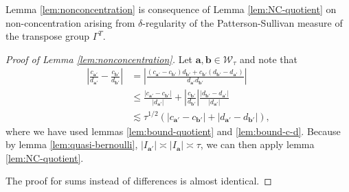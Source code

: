 \documentclass[12pt]{amsart}
\newcommand*\abs[1]{
	\left|#1\right|
}
\theoremstyle{definition}
\renewcommand{\leq}{\leqslant}
\begin{document}
Lemma \ref{lem:nonconcentration} is consequence of Lemma \ref{lem:NC-quotient} on non-concentration arising from $\delta$-regularity of the Patterson-Sullivan measure of the transpose group $\Gamma^T$.

\begin{proof}[Proof of Lemma \ref{lem:nonconcentration}]
Let $\mathbf{a}, \mathbf{b} \in \mathcal{W}_\tau$ and note that
\begin{align*}
\abs{\frac{c_{\mathbf{a}'}}{d_{\mathbf{a}'}} - \frac{c_{\mathbf{b}'}}{d_{\mathbf{b}'}}}
&= \abs{\frac{\left(c_{\mathbf{a}'} - c_{\mathbf{b}'}\right)d_{\mathbf{b}'} +c_{\mathbf{b}'}\left(d_{\mathbf{b}'} - d_{\mathbf{a}'}\right)}{d_{\mathbf{a}'}d_{\mathbf{b}'}}}\\
&\leq \frac{\abs{c_{\mathbf{a}'} - c_{\mathbf{b}'}}}{\abs{d_{\mathbf{a}'}}} + \abs{\frac{c_{\mathbf{b}'}}{d_{\mathbf{b}'}}}\frac{\abs{d_{\mathbf{b}'} - d_{\mathbf{a}'}}}{\abs{d_{\mathbf{a}'}}}\\
&\lesssim \tau^{1/2}\left(\abs{c_{\mathbf{a}'} - c_{\mathbf{b}'}} + \abs{d_{\mathbf{a}'} - d_{\mathbf{b}'}}\right),
\end{align*}
where we have used lemmas \ref{lem:bound-quotient} and \ref{lem:bound-c-d}. Because by lemma \ref{lem:quasi-bernoulli}, $\abs{I_{\mathbf{a}'}} \asymp \abs{I_\mathbf{a}} \asymp \tau$, we can then apply lemma \ref{lem:NC-quotient}.

The proof for sums instead of differences is almost identical.
\end{proof}
\end{document}
